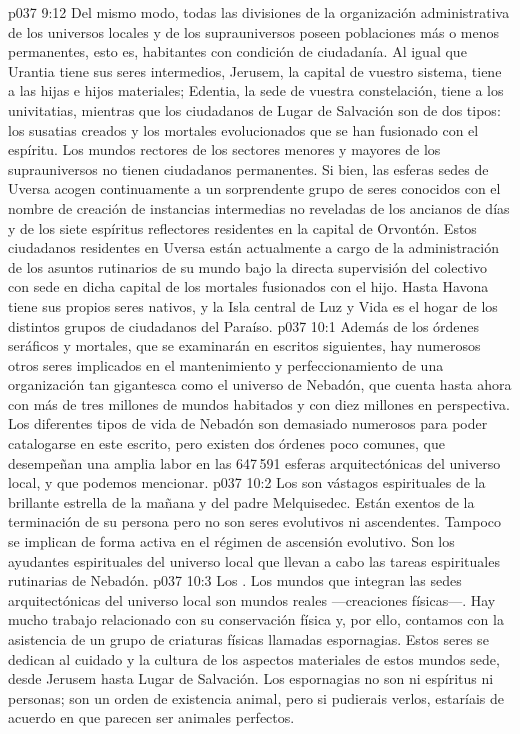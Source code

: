 \vs p037 9:12 \pc Del mismo modo, todas las divisiones de la organización administrativa de los universos locales y de los suprauniversos poseen poblaciones más o menos permanentes, esto es, habitantes con condición de ciudadanía. Al igual que Urantia tiene sus seres intermedios, Jerusem, la capital de vuestro sistema, tiene a las hijas e hijos materiales; Edentia, la sede de vuestra constelación, tiene a los univitatias, mientras que los ciudadanos de Lugar de Salvación son de dos tipos: los susatias creados y los mortales evolucionados que se han fusionado con el espíritu. Los mundos rectores de los sectores menores y mayores de los suprauniversos no tienen ciudadanos permanentes. Si bien, las esferas sedes de Uversa acogen continuamente a un sorprendente grupo de seres conocidos con el nombre de  creación de instancias intermedias no reveladas de los ancianos de días y de los siete espíritus reflectores residentes en la capital de Orvontón. Estos ciudadanos residentes en Uversa están actualmente a cargo de la administración de los asuntos rutinarios de su mundo bajo la directa supervisión del colectivo con sede en dicha capital de los mortales fusionados con el hijo. Hasta Havona tiene sus propios seres nativos, y la Isla central de Luz y Vida es el hogar de los distintos grupos de ciudadanos del Paraíso.
\vs p037 10:1 Además de los órdenes seráficos y mortales, que se examinarán en escritos siguientes, hay numerosos otros seres implicados en el mantenimiento y perfeccionamiento de una organización tan gigantesca como el universo de Nebadón, que cuenta hasta ahora con más de tres millones de mundos habitados y con diez millones en perspectiva. Los diferentes tipos de vida de Nebadón son demasiado numerosos para poder catalogarse en este escrito, pero existen dos órdenes poco comunes, que desempeñan una amplia labor en las 647\,591 esferas arquitectónicas del universo local, y que podemos mencionar.
\vs p037 10:2 \pc Los  son vástagos espirituales de la brillante estrella de la mañana y del padre Melquisedec. Están exentos de la terminación de su persona pero no son seres evolutivos ni ascendentes. Tampoco se implican de forma activa en el régimen de ascensión evolutivo. Son los ayudantes espirituales del universo local que llevan a cabo las tareas espirituales rutinarias de Nebadón.
\vs p037 10:3 \pc Los . Los mundos que integran las sedes arquitectónicas del universo local son mundos reales ---creaciones físicas---. Hay mucho trabajo relacionado con su conservación física y, por ello, contamos con la asistencia de un grupo de criaturas físicas llamadas espornagias. Estos seres se dedican al cuidado y la cultura de los aspectos materiales de estos mundos sede, desde Jerusem hasta Lugar de Salvación. Los espornagias no son ni espíritus ni personas; son un orden de existencia animal, pero si pudierais verlos, estaríais de acuerdo en que parecen ser animales perfectos.
